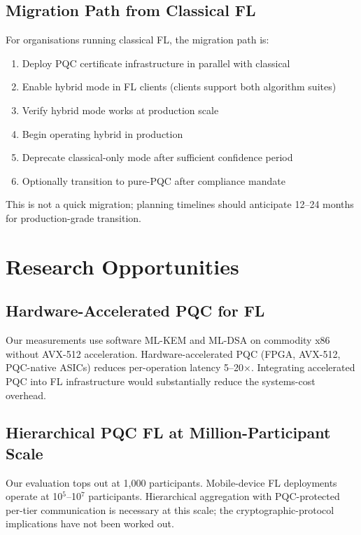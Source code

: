 \documentclass[sigconf,nonacm]{acmart}
\begin{document}
\subsection{Migration Path from Classical FL}

For organisations running classical FL, the migration path is:

\begin{enumerate}
  \item Deploy PQC certificate infrastructure in parallel with
        classical
  \item Enable hybrid mode in FL clients (clients support both
        algorithm suites)
  \item Verify hybrid mode works at production scale
  \item Begin operating hybrid in production
  \item Deprecate classical-only mode after sufficient
        confidence period
  \item Optionally transition to pure-PQC after compliance
        mandate
\end{enumerate}

This is not a quick migration; planning timelines should anticipate
12--24 months for production-grade transition.

\section{Research Opportunities}

\subsection{Hardware-Accelerated PQC for FL}

Our measurements use software ML-KEM and ML-DSA on commodity x86
without AVX-512 acceleration. Hardware-accelerated PQC (FPGA, AVX-512,
PQC-native ASICs) reduces per-operation latency 5--20$\times$.
Integrating accelerated PQC into FL infrastructure would substantially
reduce the systems-cost overhead.

\subsection{Hierarchical PQC FL at Million-Participant Scale}

Our evaluation tops out at 1{,}000 participants. Mobile-device FL
deployments operate at 10$^5$--10$^7$ participants. Hierarchical
aggregation with PQC-protected per-tier communication is necessary
at this scale; the cryptographic-protocol implications have not
been worked out.
\end{document}

